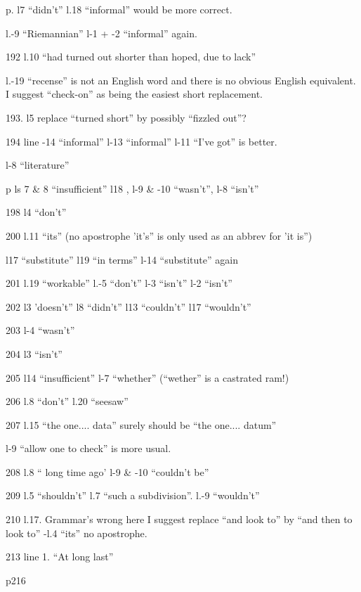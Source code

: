 
p. l7 ``didn't'' l.18 ``informal'' would be more correct.

l.-9 ``Riemannian'' l-1 + -2 ``informal'' again.

192 l.10 ``had turned out shorter than hoped, due to lack''

l.-19 ``recense'' is not an English word and there is no obvious English equivalent. I suggest ``check-on'' as being the easiest short replacement.

193. l5  replace ``turned short'' by possibly ``fizzled out''?

 194 line -14 ``informal'' l-13 ``informal'' l-11 ``I've got'' is better.

l-8 ``literature''

p ls 7 \& 8 ``insufficient'' l18  , l-9 \& -10 ``wasn't'', l-8 ``isn't''

198 l4 ``don't''

200 l.11 ``its'' (no apostrophe 'it's'' is only used as an abbrev for 'it is'')

l17 ``substitute'' l19 ``in terms'' l-14 ``substitute'' again

201 l.19 ``workable'' l.-5 ``don't'' l-3 ``isn't'' l-2 ``isn't''

202 l3 'doesn't'' l8 ``didn't'' l13 ``couldn't'' l17 ``wouldn't''

203 l-4 ``wasn't''

204 l3 ``isn't''

205 l14 ``insufficient'' l-7 ``whether'' (``wether'' is a castrated ram!)

206 l.8 ``don't'' l.20 ``seesaw''

207 l.15 ``the one.... data'' surely should be ``the one.... datum''

l-9 ``allow one to check'' is more usual.

208 l.8 `` long time ago' l-9 \& -10 ``couldn't be''

209 l.5 ``shouldn't'' l.\unsure{-}7 ``such a subdivision''. l.-9 ``wouldn't''

210 l.17. Grammar's wrong here I suggest replace ``and look to'' by ``and then to look to'' -l.4 ``its'' no apostrophe.

213 line 1. ``At long last''

p216 

